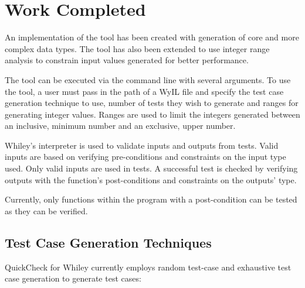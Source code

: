\chapter{Work Completed}\label{chapter:work}



An implementation of the tool has been created with generation of core and more complex data types. The tool has also been extended to use integer range analysis to constrain input values generated for better performance.

The tool can be executed via the command line with several arguments. To use the tool, a user must pass in the path of a WyIL file and specify the test case generation technique to use, number of tests they wish to generate and ranges for generating integer values. Ranges are used to limit the integers generated between an inclusive, minimum number and an exclusive, upper number.

Whiley's interpreter is used to validate inputs and outputs from tests. Valid inputs are based on verifying pre-conditions and constraints on the input type used. Only valid inputs are used in tests. A successful test is checked by verifying outputs with the function's post-conditions and constraints on the outputs' type.


Currently, only functions within the program with a post-condition can be tested as they can be verified.

\section{Test Case Generation Techniques}

QuickCheck for Whiley currently employs random test-case and exhaustive test case generation to generate test cases: 

